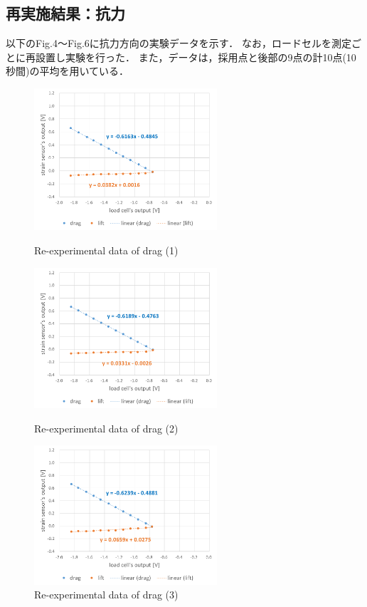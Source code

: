 \documentclass[twocolumn,a4j]{jsarticle}
\begin{document}
\newpage

\subsection{再実施結果：抗力}
以下のFig.4～Fig.6に抗力方向の実験データを示す．
なお，ロードセルを測定ごとに再設置し実験を行った．
また，データは，採用点と後部の9点の計10点(10秒間)の平均を用いている．
\begin{figure}[htbp]
    \footnotesize
    \begin{center}
        \includegraphics[width=68mm]{../images/graph_21119_drag_1.png}
        \caption{Re-experimental data of drag (1)}
        \includegraphics[width=68mm]{../images/graph_21119_drag_2.png}
        \caption{Re-experimental data of drag (2)}
        \includegraphics[width=68mm]{../images/graph_211111_drag_3.png}
        \caption{Re-experimental data of drag (3)}
    \end{center}
\end{figure}
\end{document}
